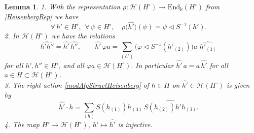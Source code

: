 \documentclass[10pt,a4paper]{amsart}
\newtheorem{lem}{Lemma}
\begin{document}
\begin{lem}\label{lemmeChapeau}
1. With the representation $\rho : \mathcal{H}(H^\circ) \to \mathrm{End}_\Bbbk(H^\circ)$ from \eqref{HeisenbergRep} we have
\begin{equation}\label{formuleRepChapeau}
\forall \, h' \in H', \:\: \forall \, \psi \in H^\circ, \quad \rho\bigl( \widehat{h'} \bigr)(\psi) = \psi \lhd S^{-1}(h').
\end{equation}
2. In $\mathcal{H}(H^\circ)$ we have the relations
\[ \textstyle \widehat{h'h''} = \widehat{h'} \, \widehat{h''}, \qquad \widehat{h'}\,\varphi a = \sum_{(h')} \bigl( \varphi \lhd S^{-1}(h'_{(2)}) \bigr)a \, \widehat{\,h'_{(1)}} \]
for all $h', h'' \in H'$, and all $\varphi a \in \mathcal{H}(H^\circ)$. In particular $\widehat{h'} \, a = a \, \widehat{h'}$ for all $a \in H \subset \mathcal{H}(H^\circ)$.
\\3. The right action \eqref{modAlgStructHeisenberg} of $h \in H$ on $\widehat{h'} \in \mathcal{H}(H^\circ)$ is given by
\[ \widehat{h'} \cdot h = \textstyle \sum_{(h)} S(h_{(1)})h_{(4)} \, \widehat{S(h_{(2)})h'h_{(3)}}. \]
4. The map $H' \to \mathcal{H}(H^\circ)$, $h' \mapsto \widehat{h'}$ is injective.
\end{lem}
\end{document}

